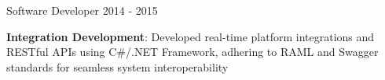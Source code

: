 \begin{cventries}
  \cventry
    {Software Developer} %
    {} %
    {} %
    {} %
    {2014 - 2015} %
    {
      \begin{cvitems} %
        \item {\textbf{Integration Development}: Developed real-time platform integrations and RESTful APIs using C\#/.NET Framework, adhering to RAML and Swagger standards for seamless system interoperability}
      \end{cvitems}
    }

\end{cventries}
